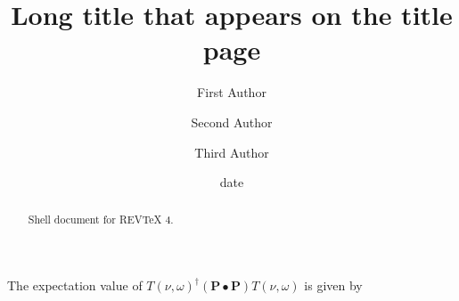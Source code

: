 \documentclass[aps,preprint]{revtex4}%
\begin{document}
\title[Short title for running header]{Long title that appears on the title page}
\author{First Author}
\author{Second Author}
\author{Third Author}

\begin{abstract}
Shell document for REV\TeX{} 4.

\end{abstract}
\date[Date text]{date}




\maketitle
\tableofcontents


The expectation value of $T\left(  \nu,\omega\right)  ^{\dagger}\left(
\mathbf{P\bullet P}\right)  T\left(  \nu,\omega\right)  $ is given by %
\end{document}
